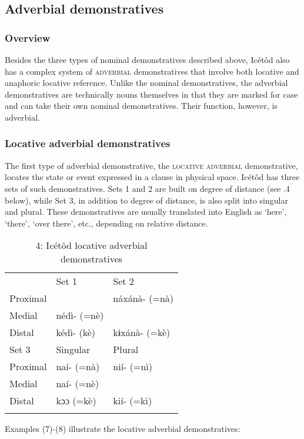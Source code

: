 \subsection{Adverbial demonstratives}
\subsubsection{Overview}

Besides the three types of nominal demonstratives described above, Icétôd also has a complex system of \textsc{adverbial} demonstratives that involve both locative and anaphoric locative reference. Unlike the nominal demonstratives, the adverbial demonstratives are technically nouns themselves in that they are marked for case and can take their own nominal demonstratives. Their function, however, is adverbial.


\subsubsection{Locative adverbial demonstratives}

The first type of adverbial demonstrative, the \textsc{locative adverbial} demonstrative, locates the state or event expressed in a clause in physical space. Icétôd has three sets of such demonstratives. Sets 1 and 2 are built on degree of distance (see .4 below), while Set 3, in addition to degree of distance, is also split into singular and plural. These demonstratives are usually translated into English as ‘here’, ‘there’, ‘over there’, etc., depending on relative distance. 


\begin{table}
\caption{4: Icétôd locative adverbial demonstratives}
\label{tab:6}


\begin{tabularx}{\textwidth}{XXX} & \multicolumn{1}{X}{Set 1} & Set 2\\
\lsptoprule
Proximal & \multicolumn{1}{X}{} & náxánà- (=nà)\\
Medial & \multicolumn{1}{X}{nédì- (=nè)} & \\
Distal & \multicolumn{1}{X}{kédì- (kè)} & kɨxánà- (=kè)\\
\multicolumn{1}{X}{Set 3} & Singular & Plural\\
Proximal & naí- (=nà) & nií- (=nì)\\
Medial & naí- (=nè) & \\
Distal & kɔɔ (=kè) & kií- (=kì)\\
\lspbottomrule
\end{tabularx}
\end{table}
Examples (7)-(8) illustrate the locative adverbial demonstratives:




